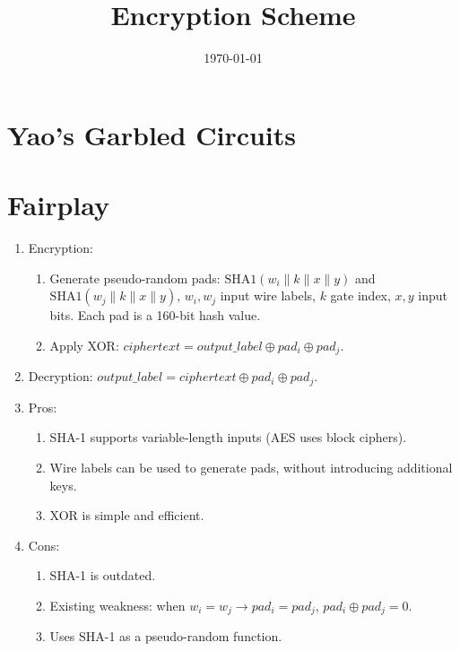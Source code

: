 \documentclass[11pt, a4paper]{article}
\title{Encryption Scheme}
\author{}
\date{\today}
\begin{document}
\maketitle

\section{Yao's Garbled Circuits}

\section{Fairplay} \cite{fairplay}

\begin{enumerate}
    \item Encryption:
        \begin{enumerate}
            \item Generate pseudo-random pads: 
            $\text{SHA1}(w_i\parallel k\parallel x\parallel y)$ and 
            $\text{SHA1}(w_j\parallel k\parallel x\parallel y)$, 
            $w_i, w_j$ input wire labels, $k$ gate index, $x, y$ input bits. 
            Each pad is a 160-bit hash value.
            \item Apply XOR: $ciphertext=output\_label\oplus pad_i\oplus pad_j$.
        \end{enumerate}
    \item Decryption: $output\_label=ciphertext\oplus pad_i\oplus pad_j$.
    \item Pros:
        \begin{enumerate}
            \item SHA-1 supports variable-length inputs (AES uses block ciphers).
            \item Wire labels can be used to generate pads, without introducing
            additional keys.
            \item XOR is simple and efficient.
        \end{enumerate}
    \item Cons:
        \begin{enumerate}
            \item SHA-1 is outdated.
            \item Existing weakness: when $w_i=w_j \rightarrow pad_i=pad_j$,
            $pad_i\oplus pad_j=0$. \cite{duplicate_input_wires}
            \item Uses SHA-1 as a pseudo-random function.
        \end{enumerate}
\end{enumerate}
\end{document}
